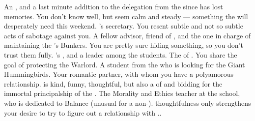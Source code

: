 \documentclass[char]{GL2020}
\begin{document}
\begin{contacts}
    \contact{\cEbbPriest{}} An \cEbb{} \cEbbPriest{\cleric}, and a last minute addition to the delegation from the \pShip{} since \cHeadDiplomat{} has lost \cHeadDiplomat{\their} memories. You don’t know \cEbbPriest{\them} well, but \cEbbPriest{\they} seem\cEbbPriest{\verbs} calm and steady — something the \pShippies{} will desperately need this weekend.
    \contact{\cChupLeader{}} \cHeadDiplomat{}'s secretary. You resent \cChupLeader{\their} subtle and not so subtle acts of sabotage against you. 
    \contact{\cBunker{}} A fellow \pShip{} advisor, friend of \cHeadDiplomat{}, and the one in charge of maintaining the \pSc{}'s Bunkers. You are pretty sure \cBunker{\theyare} hiding something, so you don’t trust them fully.
    \contact{\cPresident{}} \cHeadDiplomat{}'s \cPresident{\nibling}, and a leader among the students.
    \contact{\cWarlordDaughter{}} The \cWarlordDaughter{\offspring} of \cLoud{\full}. You share the goal of protecting the Warlord. 
    \contact{\cDisney{}} A student from the \pFarm{} who is looking for the Giant Hummingbirds.
    \contact{\cBeetle{}} Your romantic partner, with whom you have a polyamorous relationship. \cBeetle{} is kind, funny, thoughtful, but also a \cBeetle{\cleric} of \cTechGod{} and bidding for the immortal principalship of the \pSc{}.
    \contact{\cEthics{}} The Morality and Ethics teacher at the school, who is dedicated to Balance (unusual for a non-\pShippie{}). \cEthics{\Their} thoughtfulness only strengthens your desire to try to figure out a relationship with \cEthics{\them}..
\end{contacts}
\end{document}
